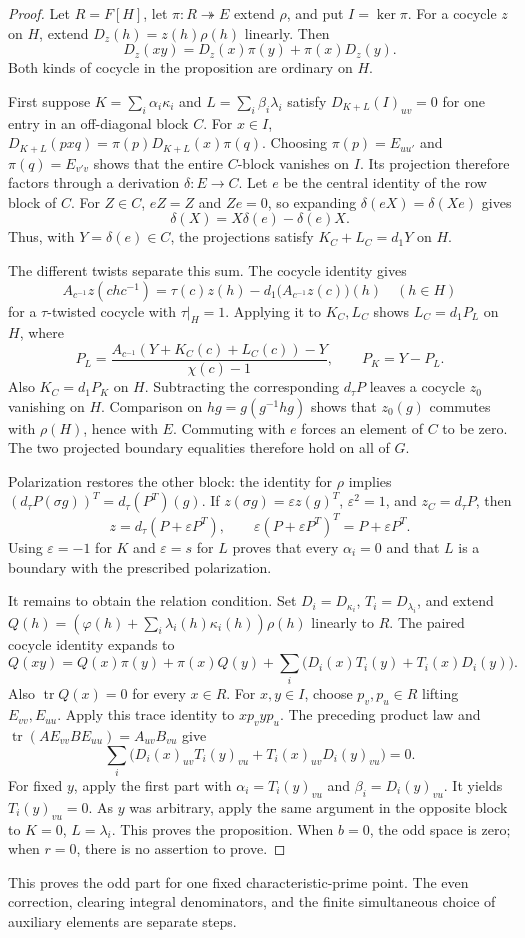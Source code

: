 \begin{proof}
Let $R=F[H]$, let $\pi:R\twoheadrightarrow E$ extend $\rho$, and
put $I=\ker\pi$. For a cocycle $z$ on $H$, extend
$D_z(h)=z(h)\rho(h)$ linearly. Then
\[
       D_z(xy)=D_z(x)\pi(y)+\pi(x)D_z(y).
\]
Both kinds of cocycle in the proposition are ordinary on $H$.

First suppose $K=\sum_i\alpha_i\kappa_i$ and
$L=\sum_i\beta_i\lambda_i$ satisfy $D_{K+L}(I)_{uv}=0$
for one entry in an off-diagonal block $C$. For $x\in I$,
$D_{K+L}(pxq)=\pi(p)D_{K+L}(x)\pi(q)$.
Choosing $\pi(p)=E_{u u'}$ and $\pi(q)=E_{v'v}$ shows that
the entire $C$-block vanishes on $I$. Its projection therefore
factors through a derivation $\delta:E\to C$.
Let $e$ be the central identity of the row block of $C$.
For $Z\in C$, $eZ=Z$ and $Ze=0$, so expanding
$\delta(eX)=\delta(Xe)$ gives
\[
                     \delta(X)=X\delta(e)-\delta(e)X.
\]
Thus, with $Y=\delta(e)\in C$, the projections satisfy
$K_C+L_C=d_1Y$ on $H$.

The different twists separate this sum. The cocycle identity gives
\[
 A_{c^{-1}}z(chc^{-1})
   =\tau(c)z(h)-d_1\bigl(A_{c^{-1}}z(c)\bigr)(h)
       \quad(h\in H)
\]
for a $\tau$-twisted cocycle with $\tau|_H=1$.
Applying it to $K_C,L_C$ shows $L_C=d_1P_L$ on $H$, where
\[
 P_L=\frac{A_{c^{-1}}(Y+K_C(c)+L_C(c))-Y}{\chi(c)-1},
 \qquad P_K=Y-P_L.
\]
Also $K_C=d_1P_K$ on $H$. Subtracting the corresponding
$d_\tau P$ leaves a cocycle $z_0$ vanishing on $H$.
Comparison on $hg=g(g^{-1}hg)$ shows that $z_0(g)$ commutes
with $\rho(H)$, hence with $E$. Commuting with $e$ forces
an element of $C$ to be zero. The two projected boundary
equalities therefore hold on all of $G$.

Polarization restores the other block: the identity for $\rho$
implies
$(d_\tau P(\sigma g))^T=d_\tau(P^T)(g)$.
If $z(\sigma g)=\varepsilon z(g)^T$, $\varepsilon^2=1$,
and $z_C=d_\tau P$, then
\[
             z=d_\tau(P+\varepsilon P^T),\qquad
             \varepsilon(P+\varepsilon P^T)^T=P+\varepsilon P^T.
\]
Using $\varepsilon=-1$ for $K$ and $\varepsilon=s$ for $L$
proves that every $\alpha_i=0$ and that $L$ is a boundary
with the prescribed polarization.

It remains to obtain the relation condition. Set
$D_i=D_{\kappa_i}$, $T_i=D_{\lambda_i}$, and extend
$Q(h)=(\varphi(h)+\sum_i\lambda_i(h)\kappa_i(h))\rho(h)$
linearly to $R$. The paired cocycle identity expands to
\[
 Q(xy)=Q(x)\pi(y)+\pi(x)Q(y)
       +\sum_i\bigl(D_i(x)T_i(y)+T_i(x)D_i(y)\bigr).
\]
Also $\operatorname{tr}Q(x)=0$ for every $x\in R$.
For $x,y\in I$, choose $p_v,p_u\in R$ lifting
$E_{vv},E_{uu}$. Apply this trace identity to $xp_vyp_u$.
The preceding product law and
$\operatorname{tr}(AE_{vv}BE_{uu})=A_{uv}B_{vu}$ give
\[
 \sum_i\bigl(D_i(x)_{uv}T_i(y)_{vu}
                 +T_i(x)_{uv}D_i(y)_{vu}\bigr)=0.
\]
For fixed $y$, apply the first part with
$\alpha_i=T_i(y)_{vu}$ and $\beta_i=D_i(y)_{vu}$.
It yields $T_i(y)_{vu}=0$. As $y$ was arbitrary, apply the
same argument in the opposite block to $K=0$, $L=\lambda_i$.
This proves the proposition. When $b=0$, the odd space is zero;
when $r=0$, there is no assertion to prove.
\end{proof}

This proves the odd part for one fixed characteristic-prime point.
The even correction, clearing integral denominators, and the finite
simultaneous choice of auxiliary elements are separate steps.
